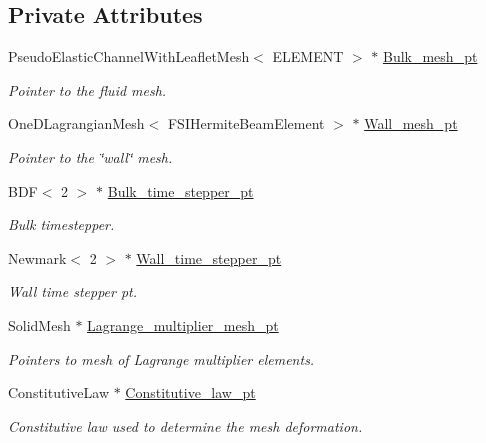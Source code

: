\subsection*{Private Attributes}
\begin{DoxyCompactItemize}
\item 
Pseudo\+Elastic\+Channel\+With\+Leaflet\+Mesh$<$ E\+L\+E\+M\+E\+NT $>$ $\ast$ \hyperlink{classFSIChannelWithLeafletProblem_a336bdec3a8b90ac09feb89e5bb3539e8}{Bulk\+\_\+mesh\+\_\+pt}
\begin{DoxyCompactList}\small\item\em Pointer to the fluid mesh. \end{DoxyCompactList}\item 
One\+D\+Lagrangian\+Mesh$<$ F\+S\+I\+Hermite\+Beam\+Element $>$ $\ast$ \hyperlink{classFSIChannelWithLeafletProblem_a943437726f0a54fa8f7fc9ffb12bc4cd}{Wall\+\_\+mesh\+\_\+pt}
\begin{DoxyCompactList}\small\item\em Pointer to the \char`\"{}wall\char`\"{} mesh. \end{DoxyCompactList}\item 
B\+DF$<$ 2 $>$ $\ast$ \hyperlink{classFSIChannelWithLeafletProblem_ac58840d4c2fefae931eb55358099c28d}{Bulk\+\_\+time\+\_\+stepper\+\_\+pt}
\begin{DoxyCompactList}\small\item\em Bulk timestepper. \end{DoxyCompactList}\item 
Newmark$<$ 2 $>$ $\ast$ \hyperlink{classFSIChannelWithLeafletProblem_ace55d5753b8a32fcac448b8a45690afb}{Wall\+\_\+time\+\_\+stepper\+\_\+pt}
\begin{DoxyCompactList}\small\item\em Wall time stepper pt. \end{DoxyCompactList}\item 
Solid\+Mesh $\ast$ \hyperlink{classFSIChannelWithLeafletProblem_aab28704c88d14a2f0975ffcdfbe913e4}{Lagrange\+\_\+multiplier\+\_\+mesh\+\_\+pt}
\begin{DoxyCompactList}\small\item\em Pointers to mesh of Lagrange multiplier elements. \end{DoxyCompactList}\item 
Constitutive\+Law $\ast$ \hyperlink{classFSIChannelWithLeafletProblem_a745553864433ae6c0f1971776249193a}{Constitutive\+\_\+law\+\_\+pt}
\begin{DoxyCompactList}\small\item\em Constitutive law used to determine the mesh deformation. \end{DoxyCompactList}\item 

\end{DoxyCompactItemize}
